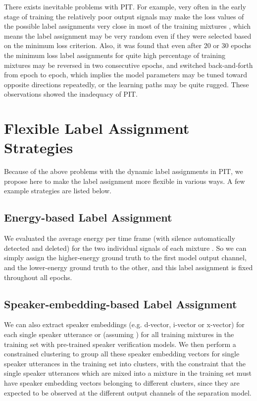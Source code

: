 \documentclass{article}
\begin{document}
There exists inevitable problems with PIT. For example, very often in the early stage of training the relatively poor output signals may make the loss values of the  possible label assignments very close in most of the training mixtures \cite{Yousefi2019}, which means the label assignment may be very random even if they were selected based on the minimum loss criterion. Also, it was found that even after 20 or 30 epochs the minimum loss label assignments for quite high percentage of training mixtures may be reversed in two consecutive epochs, and switched back-and-forth from epoch to epoch, which implies the model parameters may be tuned toward opposite directions repeatedly, or the learning paths may be quite rugged. These observations showed the inadequacy of PIT.









\vspace{-7pt}
\section{Flexible Label Assignment Strategies}
\vspace{-7pt}
Because of the above problems with the dynamic label assignments in PIT, we propose here to make the label assignment more flexible in various ways. A few example strategies are listed below.

\vspace{-7pt}
\subsection{Energy-based Label Assignment}
\vspace{-7pt}

We evaluated the average energy per time frame (with silence automatically detected and deleted) for the two individual signals  of each mixture . So we can simply assign the higher-energy ground truth to the first model output channel, and the lower-energy ground truth to the other, and this label assignment is fixed throughout all epochs.
\vspace{-7pt}
\subsection{Speaker-embedding-based Label Assignment}
\vspace{-7pt}


We can also extract speaker embeddings (e.g. d-vector\cite{Wan2017GeneralizedEL}, i-vector\cite{5545402} or x-vector\cite{8461375}) for each single speaker utterance  or  (assuming ) for all training mixtures  in the training set with pre-trained speaker verification models. We then perform a constrained clustering to group all these  speaker embedding vectors for single speaker utterances in the training set into  clusters, with the constraint that the single speaker utterances which are mixed into a mixture in the training set must have speaker embedding vectors belonging to different clusters, since they are expected to be observed at the  different output channels of the separation model.
\end{document}
